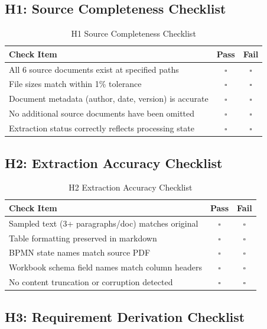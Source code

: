 \documentclass[11pt,a4paper,twoside]{report}
\begin{document}
\subsection{H1: Source Completeness Checklist}

\begin{table}[h]
\centering
\caption{H1 Source Completeness Checklist}
\begin{tabular}{@{}L{10cm}cc@{}}
\toprule
\textbf{Check Item} & \textbf{Pass} & \textbf{Fail} \\
\midrule
All 6 source documents exist at specified paths & $\square$ & $\square$ \\
File sizes match within 1\% tolerance & $\square$ & $\square$ \\
Document metadata (author, date, version) is accurate & $\square$ & $\square$ \\
No additional source documents have been omitted & $\square$ & $\square$ \\
Extraction status correctly reflects processing state & $\square$ & $\square$ \\
\bottomrule
\end{tabular}
\end{table}

\subsection{H2: Extraction Accuracy Checklist}

\begin{table}[h]
\centering
\caption{H2 Extraction Accuracy Checklist}
\begin{tabular}{@{}L{10cm}cc@{}}
\toprule
\textbf{Check Item} & \textbf{Pass} & \textbf{Fail} \\
\midrule
Sampled text (3+ paragraphs/doc) matches original & $\square$ & $\square$ \\
Table formatting preserved in markdown & $\square$ & $\square$ \\
BPMN state names match source PDF & $\square$ & $\square$ \\
Workbook schema field names match column headers & $\square$ & $\square$ \\
No content truncation or corruption detected & $\square$ & $\square$ \\
\bottomrule
\end{tabular}
\end{table}

\subsection{H3: Requirement Derivation Checklist}
\end{document}
